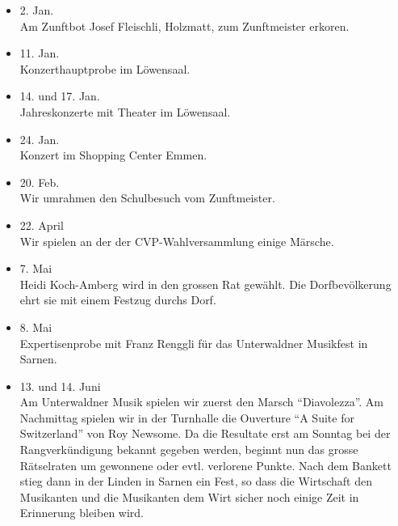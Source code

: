 \begin{history}


    \begin{itemize}

        \item[]2. Jan.\\
        Am Zunftbot Josef Fleischli, Holzmatt, zum Zunftmeister erkoren.

        \item[]11. Jan.\\
        Konzerthauptprobe im Löwensaal.

        \item[]14. und 17. Jan.\\
        Jahreskonzerte mit Theater im Löwensaal.

        \item[]24. Jan.\\
        Konzert im Shopping Center Emmen.

        \item[]20. Feb.\\
        Wir umrahmen den Schulbesuch vom Zunftmeister.

        \item[]22. April\\
        Wir spielen an der der CVP-Wahlversammlung einige Märsche.

        \item[]7. Mai\\
        Heidi Koch-Amberg wird in den grossen Rat gewählt.
        Die Dorfbevölkerung ehrt sie mit einem Festzug durchs Dorf.

        \item[]8. Mai\\
        Expertisenprobe mit Franz Renggli für das Unterwaldner Musikfest in Sarnen.

        \item[]13. und 14. Juni\\
        Am Unterwaldner Musik spielen wir zuerst den Marsch \enquote{Diavolezza}.
        Am Nachmittag spielen wir in der Turnhalle die Ouverture \enquote{A Suite for Switzerland} von Roy Newsome.
        Da die Resultate erst am Sonntag bei der Rangverkündigung bekannt gegeben werden,
        beginnt nun das grosse Rätselraten um gewonnene oder evtl. verlorene Punkte.
        Nach dem Bankett stieg dann in der Linden in Sarnen ein Fest, so dass die Wirtschaft den Musikanten
        und die Musikanten dem Wirt sicher noch einige Zeit in Erinnerung bleiben wird.


\end{itemize}
\end{history}
